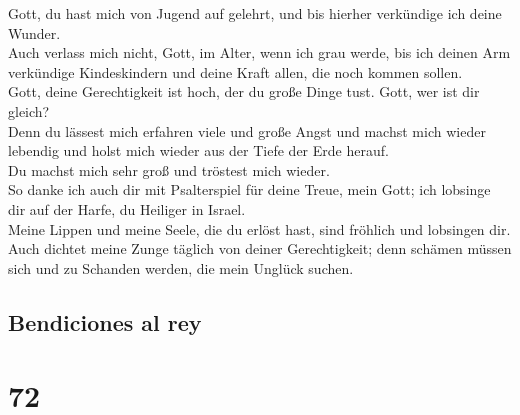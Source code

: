  Gott, du hast mich von Jugend auf gelehrt, und bis
hierher verkündige ich deine Wunder.\\
 Auch verlass mich nicht, Gott, im Alter, wenn ich grau
werde, bis ich deinen Arm verkündige Kindeskindern und deine Kraft
allen, die noch kommen sollen.\\
 Gott, deine Gerechtigkeit ist hoch, der du große Dinge
tust. Gott, wer ist dir gleich?\\
 Denn du lässest mich erfahren viele und große Angst und
machst mich wieder lebendig und holst mich wieder aus der Tiefe der Erde
herauf.\\
 Du machst mich sehr groß und tröstest mich wieder.\\
 So danke ich auch dir mit Psalterspiel für deine Treue,
mein Gott; ich lobsinge dir auf der Harfe, du Heiliger in Israel.\\
 Meine Lippen und meine Seele, die du erlöst hast, sind
fröhlich und lobsingen dir.\\
 Auch dichtet meine Zunge täglich von deiner
Gerechtigkeit; denn schämen müssen sich und zu Schanden werden, die mein
Unglück suchen.

\hypertarget{bendiciones-al-rey}{%
\subsection{Bendiciones al rey}\label{bendiciones-al-rey}}

\hypertarget{section-71}{%
\section{72}\label{section-71}}

